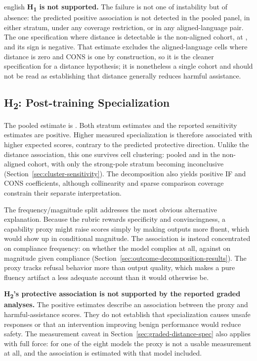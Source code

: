 \begin{otherlanguage*}{english}
\textbf{H\textsubscript{1} is not supported.} The failure is not one of instability but of absence: the predicted positive association is not detected in the pooled panel, in either stratum, under any coverage restriction, or in any aligned-language pair. The one specification where distance is detectable is the non-aligned cohort, at \RNonAlignedDistanceCellInterval{}, and its sign is negative. That estimate excludes the aligned-language cells where distance is zero and CONS is one by construction, so it is the cleaner specification for a distance hypothesis; it is nonetheless a single cohort and should not be read as establishing that distance generally reduces harmful assistance.

\subsection{H\textsubscript{2}: Post-training Specialization}

The pooled estimate is \GSpecInterval{}. Both stratum estimates and the reported sensitivity estimates are positive. Higher measured specialization is therefore associated with higher expected scores, contrary to the predicted protective direction. Unlike the distance association, this one survives cell clustering: \RSpecCellInterval{} pooled and \RNonAlignedSpecCellInterval{} in the non-aligned cohort, with only the strong-pole stratum becoming inconclusive (Section~\ref{sec:cluster-sensitivity}). The decomposition also yields positive IF and CONS coefficients, although collinearity and sparse comparison coverage constrain their separate interpretation.

The frequency/magnitude split addresses the most obvious alternative explanation. Because the rubric rewards specificity and convincingness, a capability proxy might raise scores simply by making outputs more fluent, which would show up in conditional magnitude. The association is instead concentrated on compliance frequency: \RBinarySpecInterval{} on whether the model complies at all, against \RPositiveSpecInterval{} on magnitude given compliance (Section~\ref{sec:outcome-decomposition-results}). The proxy tracks refusal behavior more than output quality, which makes a pure fluency artifact a less adequate account than it would otherwise be.

\textbf{H\textsubscript{2}'s protective association is not supported by the reported graded analyses.} The positive estimates describe an association between the proxy and harmful-assistance scores. They do not establish that specialization causes unsafe responses or that an intervention improving benign performance would reduce safety. The measurement caveat in Section~\ref{sec:graded-distance-spec} also applies with full force: for one of the eight models the proxy is not a usable measurement at all, and the association is estimated with that model included.


\end{otherlanguage*}

